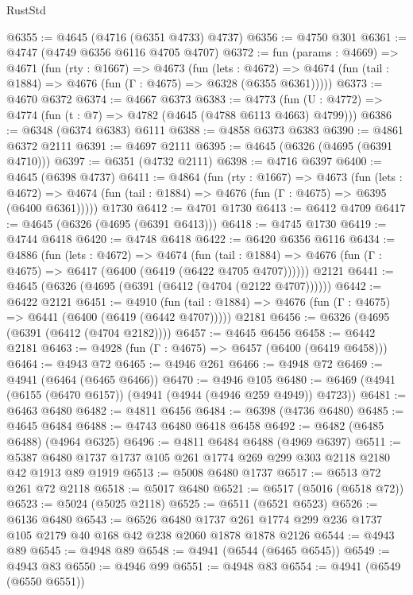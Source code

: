 \begin{lexlean}{RustStd}
\begin{coremodule}
@6355 := @4645 (@4716 (@6351 @4733) @4737)
@6356 := @4750 @301
@6361 := @4747 (@4749 @6356 @6116 @4705 @4707)
@6372 := fun (params : @4669) =>
  @4671
    (fun (rty : @1667) =>
    @4673
      (fun (lets : @4672) =>
      @4674 (fun (tail : @1884) => @4676 (fun (Γ : @4675) => @6328 (@6355 @6361)))))
@6373 := @4670 @6372
@6374 := @4667 @6373
@6383 := @4773 (fun (U : @4772) => @4774 (fun (t : @7) => @4782 (@4645 (@4788 @6113 @4663) @4799)))
@6386 := @6348 (@6374 @6383) @6111
@6388 := @4858 @6373 @6383
@6390 := @4861 @6372 @2111
@6391 := @4697 @2111
@6395 := @4645 (@6326 (@4695 (@6391 @4710)))
@6397 := @6351 (@4732 @2111)
@6398 := @4716 @6397
@6400 := @4645 (@6398 @4737)
@6411 := @4864
    (fun (rty : @1667) =>
    @4673
      (fun (lets : @4672) =>
      @4674 (fun (tail : @1884) => @4676 (fun (Γ : @4675) => @6395 (@6400 @6361)))))
    @1730
@6412 := @4701 @1730
@6413 := @6412 @4709
@6417 := @4645 (@6326 (@4695 (@6391 @6413)))
@6418 := @4745 @1730
@6419 := @4744 @6418
@6420 := @4748 @6418
@6422 := @6420 @6356 @6116
@6434 := @4886
    (fun (lets : @4672) =>
    @4674
      (fun (tail : @1884) => @4676 (fun (Γ : @4675) => @6417 (@6400 (@6419 (@6422 @4705 @4707))))))
    @2121
@6441 := @4645 (@6326 (@4695 (@6391 (@6412 (@4704 (@2122 @4707))))))
@6442 := @6422 @2121
@6451 := @4910
    (fun (tail : @1884) => @4676 (fun (Γ : @4675) => @6441 (@6400 (@6419 (@6442 @4707)))))
    @2181
@6456 := @6326 (@4695 (@6391 (@6412 (@4704 @2182))))
@6457 := @4645 @6456
@6458 := @6442 @2181
@6463 := @4928 (fun (Γ : @4675) => @6457 (@6400 (@6419 @6458)))
@6464 := @4943 @72
@6465 := @4946 @261
@6466 := @4948 @72
@6469 := @4941 (@6464 (@6465 @6466))
@6470 := @4946 @105
@6480 := @6469 (@4941 (@6155 (@6470 @6157)) (@4941 (@4944 (@4946 @259 @4949)) @4723))
@6481 := @6463 @6480
@6482 := @4811 @6456
@6484 := @6398 (@4736 @6480)
@6485 := @4645 @6484
@6488 := @4743 @6480 @6418 @6458
@6492 := @6482 (@6485 @6488) (@4964 @6325)
@6496 := @4811 @6484 @6488 (@4969 @6397)
@6511 := @5387 @6480 @1737 @1737 @105 @261 @1774 @269 @299 @303 @2118 @2180 @42 @1913 @89 @1919
@6513 := @5008 @6480 @1737
@6517 := @6513 @72 @261 @72 @2118
@6518 := @5017 @6480
@6521 := @6517 (@5016 (@6518 @72))
@6523 := @5024 (@5025 @2118)
@6525 := @6511 (@6521 @6523)
@6526 := @6136 @6480
@6543 := @6526
    @6480
    @1737
    @261
    @1774
    @299
    @236
    @1737
    @105
    @2179
    @40
    @168
    @42
    @238
    @2060
    @1878
    @1878
    @2126
@6544 := @4943 @89
@6545 := @4948 @89
@6548 := @4941 (@6544 (@6465 @6545))
@6549 := @4943 @83
@6550 := @4946 @99
@6551 := @4948 @83
@6554 := @4941 (@6549 (@6550 @6551))

\end{coremodule}
\end{lexlean}
